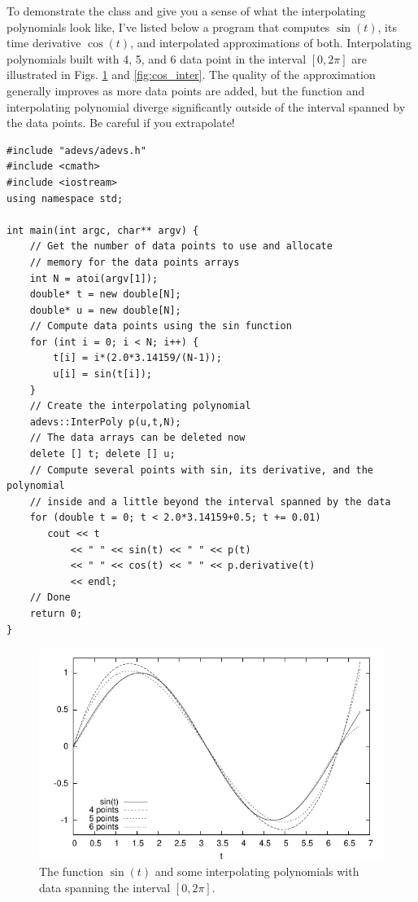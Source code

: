 To demonstrate the  class and give you a sense of what the interpolating polynomials look like, I've listed below a program that computes $\sin(t)$, its time derivative $\cos(t)$, and interpolated approximations of both. Interpolating polynomials built with 4, 5, and 6 data point in the interval $[0,2\pi]$ are illustrated in Figs. \ref{fig:sin_inter} and \ref{fig:cos_inter}. The quality of the approximation generally improves as more data points are added, but the function and interpolating polynomial diverge significantly outside of the interval spanned by the data points. Be careful if you extrapolate!
\begin{verbatim}
#include "adevs/adevs.h"
#include <cmath>
#include <iostream>
using namespace std;

int main(int argc, char** argv) {
    // Get the number of data points to use and allocate
    // memory for the data points arrays
    int N = atoi(argv[1]);
    double* t = new double[N];
    double* u = new double[N];
    // Compute data points using the sin function
    for (int i = 0; i < N; i++) {
        t[i] = i*(2.0*3.14159/(N-1));
        u[i] = sin(t[i]);
    }
    // Create the interpolating polynomial
    adevs::InterPoly p(u,t,N);
    // The data arrays can be deleted now
    delete [] t; delete [] u;
    // Compute several points with sin, its derivative, and the polynomial
    // inside and a little beyond the interval spanned by the data
    for (double t = 0; t < 2.0*3.14159+0.5; t += 0.01)
       cout << t
           << " " << sin(t) << " " << p(t)
           << " " << cos(t) << " " << p.derivative(t)
           << endl;
    // Done
    return 0;
}
\end{verbatim}
\begin{figure}[ht]
\centering
\includegraphics{interpolation_figs/sin.pdf}
\caption{The function $\sin(t)$ and some interpolating polynomials with data spanning the interval $[0,2\pi]$.}
\label{fig:sin_inter}
\end{figure}
